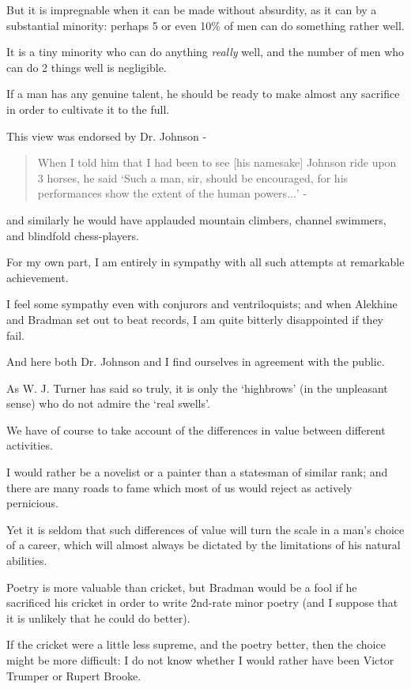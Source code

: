 \documentclass{article}
\numberwithin{equation}{section}
\begin{document}
But it is impregnable when it can be made without absurdity, as it can by a substantial minority: perhaps 5 or even 10\% of men can do something rather well.

It is a tiny minority who can do anything \textit{really} well, and the number of men who can do 2 things well is negligible.

If a man has any genuine talent, he should be ready to make almost any sacrifice in order to cultivate it to the full.

%
This view was endorsed by Dr. Johnson -
\begin{quotation}
    When I told him that I had been to see [his namesake] Johnson ride upon 3 horses, he said `Such a man, sir, should be encouraged, for his performances show the extent of the human powers$\ldots$' -
\end{quotation}
and similarly he would have applauded mountain climbers, channel swimmers, and blindfold chess-players.

For my own part, I am entirely in sympathy with all such attempts at remarkable achievement.

I feel some sympathy even with conjurors and ventriloquists; and when Alekhine and Bradman set out to beat records, I am quite bitterly disappointed if they fail.

And here both Dr. Johnson and I find ourselves in agreement with the public.

As W. J. Turner has said so truly, it is only the `highbrows' (in the unpleasant sense) who do not admire the `real swells'.

%
We have of course to take account of the differences in value between different activities.

I would rather be a novelist or a painter than a statesman of similar rank; and there are many roads to fame which most of us would reject as actively pernicious.

Yet it is seldom that such differences of value will turn the scale in a man's choice of a career, which will almost always be dictated by the limitations of his natural abilities.

Poetry is more valuable than cricket, but Bradman would be a fool if he sacrificed his cricket in order to write 2nd-rate minor poetry (and I suppose that it is unlikely that he could do better).

If the cricket were a little less supreme, and the poetry better, then the choice might be more difficult: I do not know whether I would rather have been Victor Trumper or Rupert Brooke.
\end{document}
